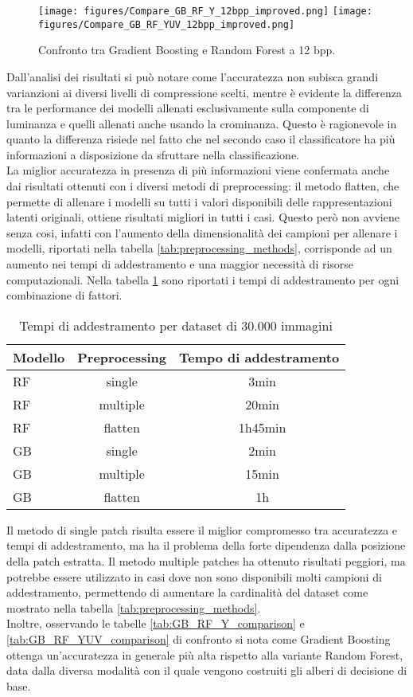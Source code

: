 \begin{figure}[H]
    \centering
    \texttt{[image: figures/Compare\_GB\_RF\_Y\_12bpp\_improved.png]}
    \texttt{[image: figures/Compare\_GB\_RF\_YUV\_12bpp\_improved.png]}
    \caption{Confronto tra Gradient Boosting e Random Forest a 12 bpp.}
    \label{fig:GB_RF_YUV_comparison}
\end{figure}
Dall'analisi dei risultati si può notare come l'accuratezza non subisca grandi varianzioni ai diversi livelli di compressione scelti, mentre è evidente la differenza tra le performance dei modelli allenati esclusivamente sulla componente di luminanza e quelli allenati anche usando la crominanza. Questo è ragionevole in quanto la differenza risiede nel fatto che nel secondo caso il classificatore ha più informazioni a disposizione da sfruttare nella classificazione.\\
La miglior accuratezza in presenza di più informazioni viene confermata anche dai risultati ottenuti con i diversi metodi di preprocessing: il metodo flatten, che permette di allenare i modelli su tutti i valori disponibili delle rappresentazioni latenti originali, ottiene risultati migliori in tutti i casi. Questo però non avviene senza cosi, infatti con l'aumento della dimensionalità dei campioni per allenare i modelli, riportati nella tabella \ref{tab:preprocessing_methods}, corrisponde ad un aumento nei tempi di addestramento e una maggior necessità di risorse computazionali. Nella tabella \ref{tab:training_times} sono riportati i tempi di addestramento per ogni combinazione di fattori.
\begin{table}[H]
\centering
\caption{Tempi di addestramento per dataset di $30.000$ immagini}\label{tab:training_times}
\begin{tabular}{l c c}
\toprule
Modello & Preprocessing & Tempo di addestramento \\
\midrule
RF &      single &  ~3min \\
RF &    multiple &  ~20min\\
RF &      flatten &  ~1h45min\\
\midrule
GB &      single &  ~2min \\
GB &    multiple &  ~15min \\
GB &      flatten &  ~1h \\
\bottomrule
\end{tabular}
\end{table}
Il metodo di single patch risulta essere il miglior compromesso tra accuratezza e tempi di addestramento, ma ha il problema della forte dipendenza dalla posizione della patch estratta. Il metodo multiple patches ha ottenuto risultati peggiori, ma potrebbe essere utilizzato in casi dove non sono disponibili molti campioni di addestramento, permettendo di aumentare la cardinalità del dataset come mostrato nella tabella \ref{tab:preprocessing_methods}.\\
Inoltre, osservando le tabelle \ref{tab:GB_RF_Y_comparison} e \ref{tab:GB_RF_YUV_comparison} di confronto si nota come Gradient Boosting ottenga un'accuratezza in generale più alta rispetto alla variante Random Forest, data dalla diversa modalità con il quale vengono costruiti gli alberi di decisione di base.\\

